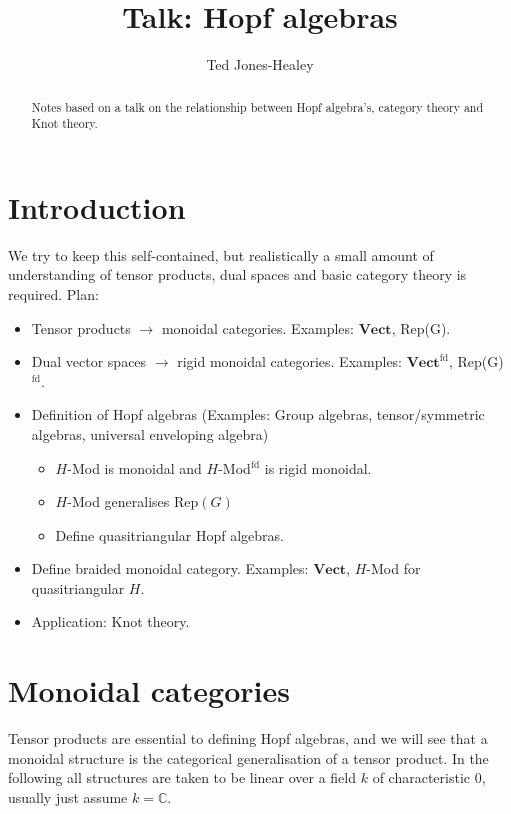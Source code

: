 \documentclass[11pt]{article}
\title{Talk: Hopf algebras}
\author{Ted Jones-Healey}
\date{}
\newcommand{\bb}{\medbreak}
\newcommand{\Cc}{\mathbb{C}}
\newcommand{\rt}{\xrightarrow{}}
\newcommand{\Vect}{\textbf{Vect}}
\theoremstyle{definition}
\begin{document}

\begin{abstract}Notes based on a talk on the relationship between Hopf algebra's, category theory and Knot theory.\end{abstract}

\tableofcontents

\section{Introduction}
We try to keep this self-contained, but realistically a small amount of understanding of tensor products, dual spaces and basic category theory is required. Plan:
\begin{itemize}
  \item Tensor products $\rt$ monoidal categories. Examples: $\Vect$, Rep(G).
  \item Dual vector spaces $\rt$ rigid monoidal categories. Examples: $\Vect^\text{fd}$, Rep(G)$^\text{fd}$.
  \item Definition of Hopf algebras (Examples: Group algebras, tensor/symmetric algebras, universal enveloping algebra)\begin{itemize}
    \item $H$-Mod is monoidal and $H$-Mod$^\text{fd}$ is rigid monoidal.
    \item $H$-Mod generalises Rep$(G)$ 
    \item Define quasitriangular Hopf algebras.
  \end{itemize}
  \item Define braided monoidal category. Examples: $\Vect$, $H$-Mod for quasitriangular $H$.
  \item Application: Knot theory.
\end{itemize}

\section{Monoidal categories}\label{mon_cat}
Tensor products are essential to defining Hopf algebras, and we will see that a monoidal structure is the categorical generalisation of a tensor product. In the following all structures are taken to be linear over a field $k$ of characteristic $0$, usually just assume $k=\Cc$.\bb
\end{document}
